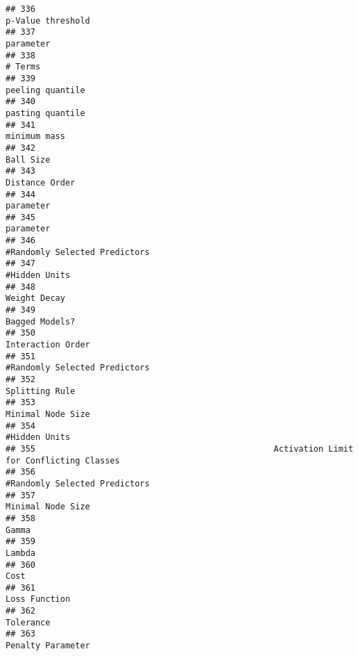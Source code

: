 \documentclass[
]{article}
\begin{document}
\begin{verbatim}
## 336                                                                       p-Value threshold
## 337                                                                               parameter
## 338                                                                                 # Terms
## 339                                                                        peeling quantile
## 340                                                                        pasting quantile
## 341                                                                            minimum mass
## 342                                                                               Ball Size
## 343                                                                          Distance Order
## 344                                                                               parameter
## 345                                                                               parameter
## 346                                                           #Randomly Selected Predictors
## 347                                                                           #Hidden Units
## 348                                                                            Weight Decay
## 349                                                                          Bagged Models?
## 350                                                                       Interaction Order
## 351                                                           #Randomly Selected Predictors
## 352                                                                          Splitting Rule
## 353                                                                       Minimal Node Size
## 354                                                                           #Hidden Units
## 355                                                Activation Limit for Conflicting Classes
## 356                                                           #Randomly Selected Predictors
## 357                                                                       Minimal Node Size
## 358                                                                                   Gamma
## 359                                                                                  Lambda
## 360                                                                                    Cost
## 361                                                                           Loss Function
## 362                                                                               Tolerance
## 363                                                                       Penalty Parameter

\end{verbatim}
\end{document}
